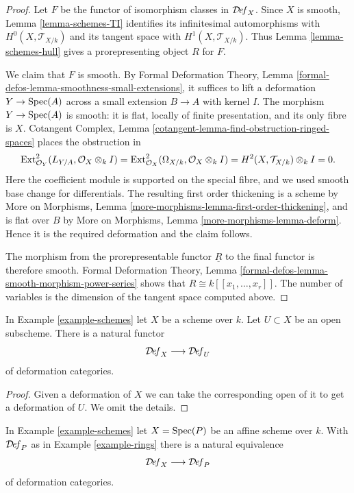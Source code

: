 \begin{proof}
Let $F$ be the functor of isomorphism classes in
$\mathcal{D}\!\mathit{ef}_X$. Since $X$ is smooth, Lemma \ref{lemma-schemes-TI}
identifies its infinitesimal automorphisms with
$H^0(X, \mathcal{T}_{X/k})$ and its tangent space with
$H^1(X, \mathcal{T}_{X/k})$. Thus Lemma \ref{lemma-schemes-hull} gives a
prorepresenting object $R$ for $F$.

\medskip\noindent
We claim that $F$ is smooth. By Formal Deformation Theory, Lemma
\ref{formal-defos-lemma-smoothness-small-extensions}, it suffices to lift a
deformation $Y \to \mathop{\mathrm{Spec}}(A)$ across a small extension $B \to A$ with kernel
$I$. The morphism $Y \to \mathop{\mathrm{Spec}}(A)$ is smooth: it is flat, locally of finite
presentation, and its only fibre is $X$. Cotangent Complex, Lemma
\ref{cotangent-lemma-find-obstruction-ringed-spaces} places the obstruction in
$$
\mathop{\mathrm{Ext}}\nolimits^2_{\mathcal{O}_Y}
(L_{Y/A}, \mathcal{O}_X \otimes_k I)
= \mathop{\mathrm{Ext}}\nolimits^2_{\mathcal{O}_X}
(\Omega_{X/k}, \mathcal{O}_X \otimes_k I)
= H^2(X, \mathcal{T}_{X/k}) \otimes_k I = 0.
$$
Here the coefficient module is supported on the special fibre, and we used
smooth base change for differentials. The resulting first order thickening is
a scheme by More on Morphisms, Lemma
\ref{more-morphisms-lemma-first-order-thickening}, and is flat over $B$ by
More on Morphisms, Lemma \ref{more-morphisms-lemma-deform}. Hence it is the
required deformation and the claim follows.

\medskip\noindent
The morphism from the prorepresentable functor $\underline{R}$ to the final
functor is therefore smooth. Formal Deformation Theory, Lemma
\ref{formal-defos-lemma-smooth-morphism-power-series} shows that
$R \cong k[[x_1, \ldots, x_r]]$. The number of variables is the dimension of
the tangent space computed above.
\end{proof}

\begin{lemma}
\label{lemma-open}
In Example \ref{example-schemes} let $X$ be a scheme over $k$.
Let $U \subset X$ be an open subscheme.
There is a natural functor
$$
\mathcal{D}\!\mathit{ef}_X \longrightarrow \mathcal{D}\!\mathit{ef}_U
$$
of deformation categories.
\end{lemma}

\begin{proof}
Given a deformation of $X$ we can take the corresponding open
of it to get a deformation of $U$. We omit the details.
\end{proof}

\begin{lemma}
\label{lemma-affine}
In Example \ref{example-schemes} let $X = \mathop{\mathrm{Spec}}(P)$ be an
affine scheme over $k$. With $\mathcal{D}\!\mathit{ef}_P$ as in
Example \ref{example-rings} there is a natural equivalence
$$
\mathcal{D}\!\mathit{ef}_X \longrightarrow \mathcal{D}\!\mathit{ef}_P
$$
of deformation categories.
\end{lemma}

